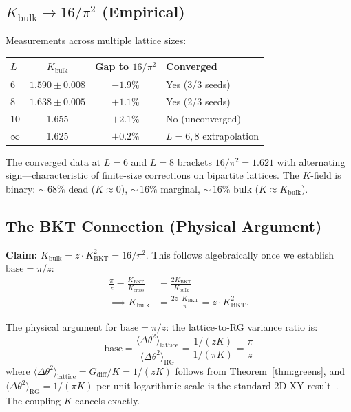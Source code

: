\documentclass[aps,prd,onecolumn,superscriptaddress,floatfix,12pt]{revtex4-2}
\newcommand{\Kbulk}{K_{\text{bulk}}}
\newcommand{\KBKT}{K_{\text{BKT}}}
\newcommand{\Gdiff}{G_{\text{diff}}}
\begin{document}
\subsection{$\Kbulk \to 16/\pi^2$ (Empirical)}\label{sec:5-4}

Measurements across multiple lattice sizes:

\begin{table}[h]
\begin{tabular}{lccl}
\toprule
$L$ & $\Kbulk$ & Gap to $16/\pi^2$ & Converged \\
\midrule
6 & $1.590 \pm 0.008$ & $-1.9\%$ & Yes (3/3 seeds) \\
8 & $1.638 \pm 0.005$ & $+1.1\%$ & Yes (2/3 seeds) \\
10 & 1.655 & $+2.1\%$ & No (unconverged) \\
$\infty$ & 1.625 & $+0.2\%$ & $L{=}6,8$ extrapolation \\
\bottomrule
\end{tabular}
\end{table}

The converged data at $L = 6$ and $L = 8$ brackets $16/\pi^2 = 1.621$ with alternating sign---characteristic of finite-size corrections on bipartite lattices. The $K$-field is binary: ${\sim}\,68\%$ dead ($K \approx 0$), ${\sim}\,16\%$ marginal, ${\sim}\,16\%$ bulk ($K \approx \Kbulk$).

\subsection{The BKT Connection (Physical Argument)}\label{sec:5-5}

\textbf{Claim:} $\Kbulk = z \cdot \KBKT^2 = 16/\pi^2$. This follows algebraically once we establish $\text{base} = \pi/z$:
\begin{align}
\frac{\pi}{z} = \frac{\KBKT}{K_{\text{cross}}} &= \frac{2\KBKT}{\Kbulk} \nonumber \\
\implies \Kbulk &= \frac{2z \cdot \KBKT}{\pi} = z \cdot \KBKT^2.
\end{align}

The physical argument for $\text{base} = \pi/z$: the lattice-to-RG variance ratio is:
\begin{equation}
\text{base} = \frac{\langle\Delta\theta^2\rangle_{\text{lattice}}}{\langle\Delta\theta^2\rangle_{\text{RG}}} = \frac{1/(zK)}{1/(\pi K)} = \frac{\pi}{z}
\end{equation}
where $\langle\Delta\theta^2\rangle_{\text{lattice}} = \Gdiff/K = 1/(zK)$ follows from Theorem~\ref{thm:greens}, and $\langle\Delta\theta^2\rangle_{\text{RG}} = 1/(\pi K)$ per unit logarithmic scale is the standard 2D XY result~\cite{Kosterlitz1974}. The coupling $K$ cancels exactly.
\end{document}
